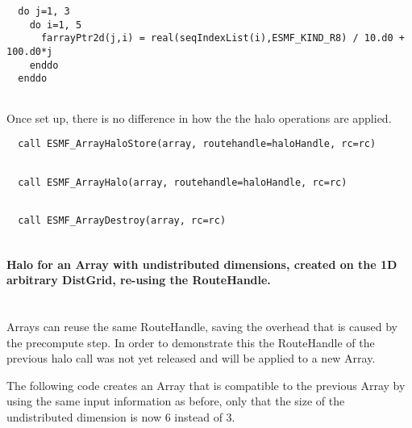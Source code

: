 
 \begin{verbatim}
  do j=1, 3
    do i=1, 5
      farrayPtr2d(j,i) = real(seqIndexList(i),ESMF_KIND_R8) / 10.d0 + 100.d0*j
    enddo
  enddo
 
\end{verbatim}
 

   Once set up, there is no difference in how the the halo operations are applied. 

 \begin{verbatim}
  call ESMF_ArrayHaloStore(array, routehandle=haloHandle, rc=rc)
 
\end{verbatim}
 

 \begin{verbatim}
  call ESMF_ArrayHalo(array, routehandle=haloHandle, rc=rc)
 
\end{verbatim}
 

 \begin{verbatim}
  call ESMF_ArrayDestroy(array, rc=rc)
 
\end{verbatim}
 

   \paragraph{Halo for an Array with undistributed dimensions, created on
   the 1D arbitrary DistGrid, re-using the RouteHandle.}
   \mbox{} \\
  
   Arrays can reuse the same RouteHandle, saving the overhead that is caused by
   the precompute step. In order to demonstrate this the RouteHandle of the
   previous halo call was not yet released and will be applied to a new Array.
  
   The following code creates an Array that is compatible to the 
   previous Array by using the same input information as before, only that
   the size of the undistributed dimension is now 6 instead of 3. 

